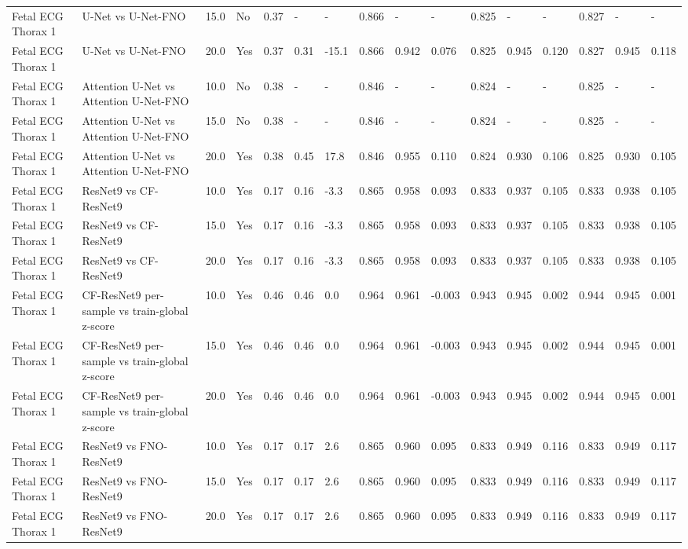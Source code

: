 \begin{longtable}{llllllllllllllll}
Fetal ECG Thorax 1 & U-Net vs U-Net-FNO & 15.0 & No & 0.37 & - & - & 0.866 & - & - & 0.825 & - & - & 0.827 & - & - \\
Fetal ECG Thorax 1 & U-Net vs U-Net-FNO & 20.0 & Yes & 0.37 & 0.31 & -15.1 & 0.866 & 0.942 & 0.076 & 0.825 & 0.945 & 0.120 & 0.827 & 0.945 & 0.118 \\
Fetal ECG Thorax 1 & Attention U-Net vs Attention U-Net-FNO & 10.0 & No & 0.38 & - & - & 0.846 & - & - & 0.824 & - & - & 0.825 & - & - \\
Fetal ECG Thorax 1 & Attention U-Net vs Attention U-Net-FNO & 15.0 & No & 0.38 & - & - & 0.846 & - & - & 0.824 & - & - & 0.825 & - & - \\
Fetal ECG Thorax 1 & Attention U-Net vs Attention U-Net-FNO & 20.0 & Yes & 0.38 & 0.45 & 17.8 & 0.846 & 0.955 & 0.110 & 0.824 & 0.930 & 0.106 & 0.825 & 0.930 & 0.105 \\
Fetal ECG Thorax 1 & ResNet9 vs CF-ResNet9 & 10.0 & Yes & 0.17 & 0.16 & -3.3 & 0.865 & 0.958 & 0.093 & 0.833 & 0.937 & 0.105 & 0.833 & 0.938 & 0.105 \\
Fetal ECG Thorax 1 & ResNet9 vs CF-ResNet9 & 15.0 & Yes & 0.17 & 0.16 & -3.3 & 0.865 & 0.958 & 0.093 & 0.833 & 0.937 & 0.105 & 0.833 & 0.938 & 0.105 \\
Fetal ECG Thorax 1 & ResNet9 vs CF-ResNet9 & 20.0 & Yes & 0.17 & 0.16 & -3.3 & 0.865 & 0.958 & 0.093 & 0.833 & 0.937 & 0.105 & 0.833 & 0.938 & 0.105 \\
Fetal ECG Thorax 1 & CF-ResNet9 per-sample vs train-global z-score & 10.0 & Yes & 0.46 & 0.46 & 0.0 & 0.964 & 0.961 & -0.003 & 0.943 & 0.945 & 0.002 & 0.944 & 0.945 & 0.001 \\
Fetal ECG Thorax 1 & CF-ResNet9 per-sample vs train-global z-score & 15.0 & Yes & 0.46 & 0.46 & 0.0 & 0.964 & 0.961 & -0.003 & 0.943 & 0.945 & 0.002 & 0.944 & 0.945 & 0.001 \\
Fetal ECG Thorax 1 & CF-ResNet9 per-sample vs train-global z-score & 20.0 & Yes & 0.46 & 0.46 & 0.0 & 0.964 & 0.961 & -0.003 & 0.943 & 0.945 & 0.002 & 0.944 & 0.945 & 0.001 \\
Fetal ECG Thorax 1 & ResNet9 vs FNO-ResNet9 & 10.0 & Yes & 0.17 & 0.17 & 2.6 & 0.865 & 0.960 & 0.095 & 0.833 & 0.949 & 0.116 & 0.833 & 0.949 & 0.117 \\
Fetal ECG Thorax 1 & ResNet9 vs FNO-ResNet9 & 15.0 & Yes & 0.17 & 0.17 & 2.6 & 0.865 & 0.960 & 0.095 & 0.833 & 0.949 & 0.116 & 0.833 & 0.949 & 0.117 \\
Fetal ECG Thorax 1 & ResNet9 vs FNO-ResNet9 & 20.0 & Yes & 0.17 & 0.17 & 2.6 & 0.865 & 0.960 & 0.095 & 0.833 & 0.949 & 0.116 & 0.833 & 0.949 & 0.117 \\

\end{longtable}
